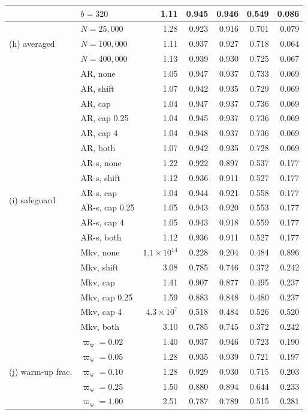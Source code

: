 \begin{longtable}{llrrrrr}
 & $b=320$ & 1.11 & 0.945 & 0.946 & 0.549 & 0.086 \\
\midrule
\multirow{3}{*}{(h) averaged} & $N=25{,}000$ & 1.28 & 0.923 & 0.916 & 0.701 & 0.079 \\*
 & $N=100{,}000$ & 1.11 & 0.937 & 0.927 & 0.718 & 0.064 \\*
 & $N=400{,}000$ & 1.13 & 0.939 & 0.930 & 0.725 & 0.067 \\
\midrule
\multirow{18}{*}{(i) safeguard} & AR, none & 1.05 & 0.947 & 0.937 & 0.733 & 0.069 \\*
 & AR, shift & 1.07 & 0.942 & 0.935 & 0.729 & 0.069 \\*
 & AR, cap & 1.04 & 0.947 & 0.937 & 0.736 & 0.069 \\*
 & AR, cap 0.25 & 1.04 & 0.945 & 0.937 & 0.736 & 0.069 \\*
 & AR, cap 4 & 1.04 & 0.948 & 0.937 & 0.736 & 0.069 \\*
 & AR, both & 1.07 & 0.942 & 0.935 & 0.728 & 0.069 \\*
 & AR-s, none & 1.22 & 0.922 & 0.897 & 0.537 & 0.177 \\*
 & AR-s, shift & 1.12 & 0.936 & 0.911 & 0.527 & 0.177 \\*
 & AR-s, cap & 1.04 & 0.944 & 0.921 & 0.558 & 0.177 \\*
 & AR-s, cap 0.25 & 1.05 & 0.943 & 0.920 & 0.553 & 0.177 \\*
 & AR-s, cap 4 & 1.05 & 0.943 & 0.918 & 0.559 & 0.177 \\*
 & AR-s, both & 1.12 & 0.936 & 0.911 & 0.527 & 0.177 \\*
 & Mkv, none & \ensuremath{1.1\times10^{14}} & 0.228 & 0.204 & 0.484 & 0.896 \\*
 & Mkv, shift & 3.08 & 0.785 & 0.746 & 0.372 & 0.242 \\*
 & Mkv, cap & 1.41 & 0.907 & 0.877 & 0.495 & 0.237 \\*
 & Mkv, cap 0.25 & 1.59 & 0.883 & 0.848 & 0.480 & 0.237 \\*
 & Mkv, cap 4 & \ensuremath{4.3\times10^{7}} & 0.518 & 0.484 & 0.526 & 0.520 \\*
 & Mkv, both & 3.10 & 0.785 & 0.745 & 0.372 & 0.242 \\
\midrule
\multirow{5}{*}{(j) warm-up frac.} & $\varpi_{\mathrm w}=0.02$ & 1.40 & 0.937 & 0.946 & 0.723 & 0.190 \\*
 & $\varpi_{\mathrm w}=0.05$ & 1.28 & 0.935 & 0.939 & 0.721 & 0.197 \\*
 & $\varpi_{\mathrm w}=0.10$ & 1.28 & 0.929 & 0.930 & 0.715 & 0.203 \\*
 & $\varpi_{\mathrm w}=0.25$ & 1.50 & 0.880 & 0.894 & 0.644 & 0.233 \\*
 & $\varpi_{\mathrm w}=1.00$ & 2.51 & 0.787 & 0.789 & 0.515 & 0.281 \\
\end{longtable}
\endgroup

